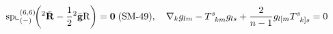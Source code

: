 \documentclass[preview]{standalone}
\begin{document}
\begin{align*}
\special{dvisvgm:raw <g id='unique000'>}\operatorname{sp}\llcorner_{(-)}^{(6,6)}\!\left({}^2\bar{\mathbf{R}} - \frac{1}{2}{}^2\bar{\mathbf{g}}\mathrm{R}\right) = \mathbf{0}\;(\text{SM-49}),\quad \nabla_k g_{lm} - T^s_{\;\;km}g_{ls} + \frac{2}{n-1}g_{l[m}T^s_{\;\;k]s} = 0\special{dvisvgm:raw </g>}
\end{align*}
\end{document}
